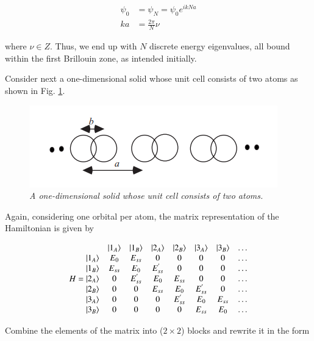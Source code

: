 \documentclass{resonance}
\begin{document}
\begin{equation}
\begin{aligned}
    \psi_{0} &= \psi_{N} = \psi_{0}e^{ikNa} \\
    ka &= \frac{2\pi}{N}\nu
\end{aligned}  
\end{equation}

where $\nu \in Z$. Thus, we end up with $N$ discrete energy eigenvalues, all bound within the first Brillouin zone, as intended initially. \par

Consider next a one-dimensional solid whose unit cell consists of two atoms as shown in Fig. \ref{peierls}.

\begin{figure}[!t]
\caption{\textit{A one-dimensional solid whose unit cell consists of two atoms.}}\label{peierls}
\centering
\includegraphics[scale=0.6]{peierls.png}
\end{figure}

Again, considering one orbital per atom, the matrix representation of the Hamiltonian is given by

\begin{equation}
H =
\begin{matrix}
     & \ket{1_A} & \ket{1_B} & \ket{2_A} & \ket{2_B} & \ket{3_A} & \ket{3_B} & \ldots\\
    \ket{1_A} & E_0 & E_{ss} & 0 & 0 & 0 & 0 & \ldots \\
    \ket{1_B} & E_{ss} & E_0 & E_{ss}^{'} & 0 & 0 & 0 & \ldots \\
    \ket{2_A} & 0 & E_{ss}^{'} & E_0 & E_{ss} & 0 & 0 & \ldots \\
    \ket{2_B} & 0 & 0 & E_{ss} & E_0 & E_{ss}^{'} & 0 & \ldots \\
    \ket{3_A} & 0 & 0 & 0 & E_{ss}^{'} & E_0 & E_{ss} & \ldots \\
    \ket{3_B} & 0 & 0 & 0 & 0 & E_{ss} & E_{0} & \ldots \\
\end{matrix}   
\end{equation}

Combine the elements of the matrix into ($2 \times 2$) blocks and rewrite it in the form
\end{document}
